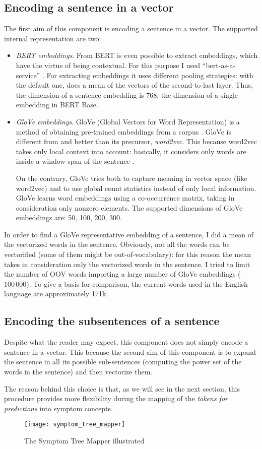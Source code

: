 \subsection{Encoding a sentence in a vector}
The first aim of this component is encoding a sentence in a vector. The supported internal representation are two:
\begin{itemize}
  \item \textit{BERT embeddings}. From BERT is even possible to extract embeddings, which have the virtue of being contextual. For this purpose I used ``bert-as-a-service'' \cite{baas}. For extracting embeddings it uses different pooling strategies: with the default one, does a mean of the vectors of the second-to-last layer. Thus, the dimension of a sentence embedding is $768$, the dimension of a single embedding in BERT Base.
  \item \textit{GloVe embeddings}. GloVe (Global Vectors for Word Representation) is a method of obtaining pre-trained embeddings from a corpus \cite{glove}. GloVe is different from and better than its precursor, \textit{word2vec}. This because word2vec takes only local context into account: basically, it considers only words are inside a window span of the sentence \cite{word2vec}.
  
  On the contrary, GloVe tries both to capture meaning in vector space (like word2vec) and to use global count statistics instead of only local information. GloVe learns word embeddings using a co-occurrence matrix, taking in consideration only nonzero elements. The supported dimensions of GloVe embeddings are: 50, 100, 200, 300.
\end{itemize}

In order to find a GloVe representative embedding of a sentence, I did a mean of the vectorized words in the sentence. Obviously, not all the words can be vectorified (some of them might be out-of-vocabulary): for this reason the mean takes in consideration only the vectorized words in the sentence. I tried to limit the number of OOV words importing a large number of GloVe embeddings ($100\,000$). To give a basis for comparison, the current words used in the English language are approximately 171k.

\subsection{Encoding the subsentences of a sentence}
Despite what the reader may expect, this component does not simply encode a sentence in a vector. This because the second aim of this component is to expand the sentence in all its possible sub-sentences (computing the power set of the words in the sentence) and then vectorize them.

The reason behind this choice is that, as we will see in the next section, this procedure provides more flexibility during the mapping of the \textit{tokens for predictions} into symptom concepts.

\begin{figure}[h]
\centering
\texttt{[image: symptom\_tree\_mapper]}
\caption{The Symptom Tree Mapper illustrated}
\medskip
\label{fig:symptom_t_m}
\end{figure}
